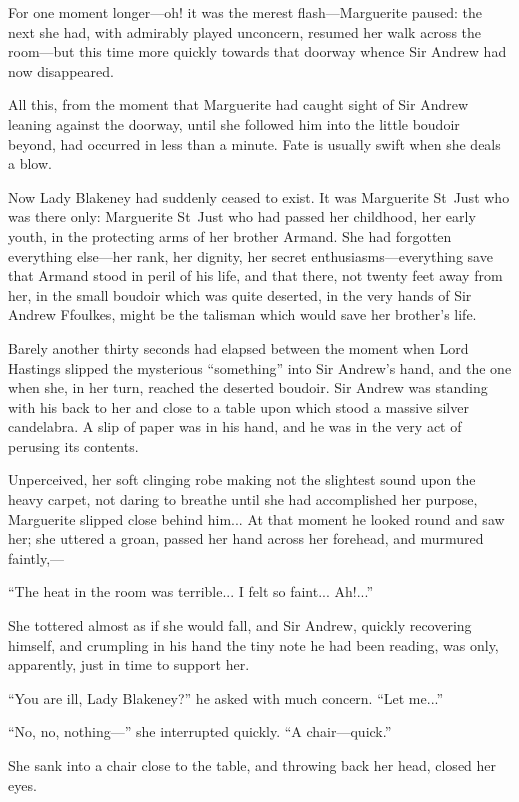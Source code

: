 For one moment longer---oh! it was the merest flash---Marguerite paused: the next she had, with admirably played unconcern, resumed her walk across the room---but this time more quickly towards that doorway whence Sir Andrew had now disappeared.

All this, from the moment that Marguerite had caught sight of Sir Andrew leaning against the doorway, until she followed him into the little boudoir beyond, had occurred in less than a minute. Fate is usually swift when she deals a blow.

Now Lady Blakeney had suddenly ceased to exist. It was Marguerite St~Just who was there only: Marguerite St~Just who had passed her childhood, her early youth, in the protecting arms of her brother Armand. She had forgotten everything else---her rank, her dignity, her secret enthusiasms---everything save that Armand stood in peril of his life, and that there, not twenty feet away from her, in the small boudoir which was quite deserted, in the very hands of Sir Andrew Ffoulkes, might be the talisman which would save her brother's life.

Barely another thirty seconds had elapsed between the moment when Lord Hastings slipped the mysterious \enquote{something} into Sir Andrew's hand, and the one when she, in her turn, reached the deserted boudoir. Sir Andrew was standing with his back to her and close to a table upon which stood a massive silver candelabra. A slip of paper was in his hand, and he was in the very act of perusing its contents.

Unperceived, her soft clinging robe making not the slightest sound upon the heavy carpet, not daring to breathe until she had accomplished her purpose, Marguerite slipped close behind him... At that moment he looked round and saw her; she uttered a groan, passed her hand across her forehead, and murmured faintly,---

\enquote{The heat in the room was terrible... I felt so faint... Ah!...}

She tottered almost as if she would fall, and Sir Andrew, quickly recovering himself, and crumpling in his hand the tiny note he had been reading, was only, apparently, just in time to support her.

\enquote{You are ill, Lady Blakeney?} he asked with much concern. \enquote{Let me...}

\enquote{No, no, nothing---} she interrupted quickly. \enquote{A chair---quick.}

She sank into a chair close to the table, and throwing back her head, closed her eyes.

